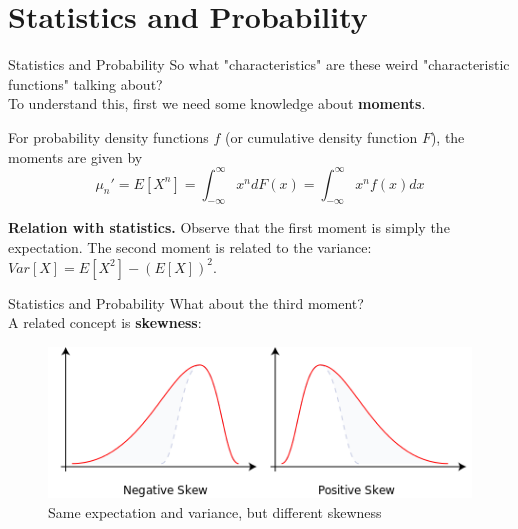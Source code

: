 \documentclass{beamer}
\begin{document}
\section{Statistics and Probability}
\begin{frame}{Statistics and Probability}
	So what "characteristics" are these weird "characteristic functions" talking about?\pause\\ To understand this, first we need some knowledge about \textbf{moments}.
	\begin{definition}[Moment]
		For probability density functions $f$ (or cumulative density function $F$), the moments are given by
		$$\mu_n' = E[X^n] = \int_{-\infty}^\infty x^ndF(x) = \int_{-\infty}^\infty x^nf(x)dx $$
	\end{definition}\pause
	\textbf{Relation with statistics.} Observe that the first moment is simply the expectation. The second moment is related to the variance: $Var[X]=E[X^2]-(E[X])^2$.
\end{frame}
\begin{frame}{Statistics and Probability}
What about the third moment?\pause\\ A related concept is \textbf{skewness}:
\begin{figure}[H]
	\centering
	\includegraphics[width=0.8\linewidth]{img/Negative_and_positive_skew_diagrams_(English)}
	\caption{Same expectation and variance, but different skewness} 
\end{figure}
\end{frame}
\end{document}
